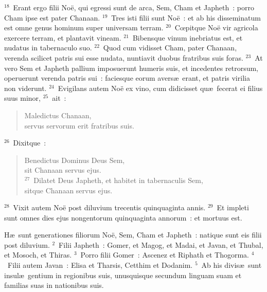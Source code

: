 ${}^{18}$~Erant ergo filii No\"e, qui egressi sunt de arca, Sem, Cham et Japheth~: porro Cham ipse est pater Chanaan.
${}^{19}$~Tres isti filii sunt No\"e~: et ab his disseminatum est omne genus hominum super universam terram.
${}^{20}$~Cœpitque No\"e vir agricola exercere terram, et plantavit vineam.
${}^{21}$~Bibensque vinum inebriatus est, et nudatus in tabernaculo suo.
${}^{22}$~Quod cum vidisset Cham, pater Chanaan, verenda scilicet patris sui esse nudata, nuntiavit duobus fratribus suis foras.
${}^{23}$~At vero Sem et Japheth pallium imposuerunt humeris suis, et incedentes retrorsum, operuerunt verenda patris sui~: faciesque eorum avers\ae\ erant, et patris virilia non viderunt.
${}^{24}$~Evigilans autem No\"e ex vino, cum didicisset qu\ae\ fecerat ei filius suus minor,
${}^{25}$~ait~: \begin{flushleft}\begin{verse}Maledictus Chanaan,\\ servus servorum erit fratribus suis.\end{verse}\end{flushleft}


${}^{26}$~Dixitque~: \begin{flushleft}\begin{verse}Benedictus Dominus Deus Sem,\\ sit Chanaan servus ejus.\\
${}^{27}$~Dilatet Deus Japheth, et habitet in tabernaculis Sem,\\ sitque Chanaan servus ejus.\end{verse}\end{flushleft}


${}^{28}$~Vixit autem No\"e post diluvium trecentis quinquaginta annis.
${}^{29}$~Et impleti sunt omnes dies ejus nongentorum quinquaginta annorum~: et mortuus est.

\lettrine[lines=3,image=true,loversize=0.05,lraise=-0.03]{H}{}\ae\ sunt generationes filiorum No\"e, Sem, Cham et Japheth~: natique sunt eis filii post diluvium.
${}^{2}$~Filii Japheth~: Gomer, et Magog, et Madai, et Javan, et Thubal, et Mosoch, et Thiras.
${}^{3}$~Porro filii Gomer~: Ascenez et Riphath et Thogorma.
${}^{4}$~Filii autem Javan~: Elisa et Tharsis, Cetthim et Dodanim.
${}^{5}$~Ab his divis\ae\ sunt insul\ae\ gentium in regionibus suis, unusquisque secundum linguam suam et familias suas in nationibus suis.


